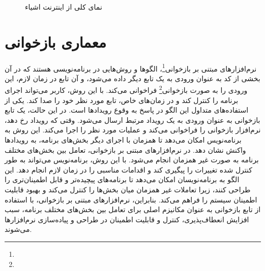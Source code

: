 {\begin{figure}[H]
        \caption{نمای کلی از اینترنت اشیاء}
        \label{fig:iot}
    \end{figure}
}

\section{معماری بازخوانی}
\label{sec:callback}
\paragraph{}
{
    نرم‌افزارهای مبتنی بر بازخوانی\footnote{}، الگوها و روش‌هایی در برنامه‌نویسی هستند که در آن بخشی از کد به عنوان ورودی به یک تابع دیگر داده می‌شود، و آن تابع در زمان لازم، این ورودی را به صورت بازخوانی\footnote{} فراخوانی می‌کند. با این روش، کاربر می‌تواند اجرای برنامه را کنترل کند و در زمان‌های خاص، تابع مورد نظر خود را صدا کند.
    یکی از استفاده‌های متداول این الگو در پاسخ به وقوع رویدادها است. در این حالت، یک تابع بازخوانی به عنوان ورودی به یک رویداد مرتبط ارسال می‌شود. وقتی که رویداد رخ دهد، نرم‌افزار بازخوانی را فراخوانی می‌کند و عملیات مورد نظر را اجرا می‌کند. این روش به برنامه‌نویس امکان می‌دهد تا همزمان با اجرای دیگر بخش‌های برنامه، به رویدادها واکنش نشان دهد.
    در نرم‌افزارهای مبتنی بر بازخوانی، تعامل بین بخش‌های مختلف برنامه به صورت غیر همزمان انجام می‌شود. با این روش، برنامه‌نویس می‌تواند به طور کنترل شده تغییرات را پیگیری کند و اقدامات مناسبی را در زمان لازم انجام دهد. این الگو به برنامه‌نویسان امکان می‌دهد تا برنامه‌های پیچیده‌تر و قابل اطمینان‌تری را طراحی کنند، زیرا تعاملات غیر همزمان میان بخش‌ها را کنترل می‌کند و بهبود قابلیت اطمینان سیستم را فراهم می‌کند.
    بنابراین، نرم‌افزارهای مبتنی بر بازخوانی، با استفاده از تابع بازخوانی به عنوان مکانیزم اصلی برای تعامل بین بخش‌های مختلف برنامه، سبب افزایش انعطاف‌پذیری، کنترل و قابلیت اطمینان در طراحی و پیاده‌سازی نرم‌افزارها می‌شوند.
}


